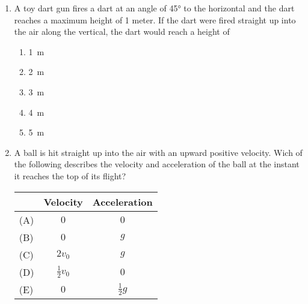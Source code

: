 \documentclass{../../../oss-apphys}
\begin{document}
\begin{multicols}{2}
\begin{enumerate}[resume,leftmargin=18pt]
  \item A toy dart gun fires a dart at an angle of \ang{45} to the
    horizontal and the dart reaches a maximum height of 1 meter. If the dart
    were fired straight up into the air along the vertical, the dart would
    reach a height of
    \begin{enumerate}[nosep,leftmargin=18pt,label=(\Alph*)]
    \item\SI{1}{\metre}
    \item\SI{2}{\metre}
    \item\SI{3}{\metre}
    \item\SI{4}{\metre}
    \item\SI{5}{\metre}
    \end{enumerate}
    
      
  \item A ball is hit straight up into the air with an upward positive
    velocity. Wich of the following describes the velocity and acceleration
    of the ball at the instant it reaches the top of its flight?
    \begin{tabular}{lcc}
      & Velocity & Acceleration\\ \hline
      (A) & $0$ & $0$\\
      (B) & $0$ & $g$\\
      (C) & $2v_0$ & $g$\\
      (D) & $\frac{1}{2}v_0$ & $0$\\
      (E) & $0$ & $\frac12g$
    \end{tabular}    
    

\end{enumerate}
\end{multicols}
\end{document}

